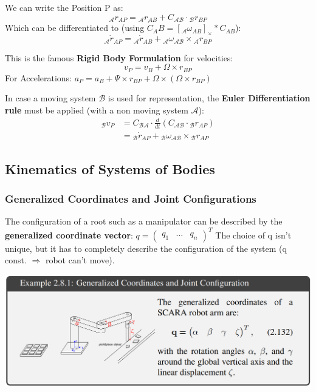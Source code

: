 \documentclass[fontsize=6pt,DIV=calc,a4paper,ngerman]{scrartcl}
\begin{document}
\begin{multicols*}{4}
	We can write the Position P as:
	$${}_\mathcal{A}r_{AP}={}_\mathcal{A}r_{AB}+C_\mathcal{AB}\cdot {}_\mathcal{B}r_{BP}$$
	Which can be differentiated to (using $\dot{C}_AB = [{}_\mathcal{A} \omega_{AB}]_{\times} * C_{AB}$):
	$${}_\mathcal{A}\dot{r}_{AP}={}_\mathcal{A}\dot{r}_{AB}+{}_\mathcal{A}\omega_\mathcal{AB}\times {}_\mathcal{A}r_{BP}$$

	This is the famous \textbf{Rigid Body Formulation} for velocities:
	$$v_P=v_B+\Omega \times r_{BP}$$
	For Accelerations:
	$a_P=a_B+\Psi\times r_{BP}+\Omega\times(\Omega\times r_{BP})$

	\smallskip
	In case a moving system $\mathcal{B}$ is used for representation, the \textbf{Euler Differentiation rule} must be applied (with a non moving system $\mathcal{A}$):
	\begin{align*}
		{}_\mathcal{B}v_P
		 & = C_\mathcal{BA} \cdot \frac{d}{dt}(C_\mathcal{AB}\cdot {}_\mathcal{B}r_{AP})             \\
		 & = {}_\mathcal{B}\dot{r}_{AP}+{}_\mathcal{B}\omega_\mathcal{AB}\times {}_\mathcal{B}r_{AP}
	\end{align*}

	\subsection{Kinematics of Systems of Bodies}
	\subsubsection{Generalized Coordinates and Joint Configurations}
	The configuration of a root such as a manipulator can be described by the \textbf{generalized coordinate vector}: $q=\begin{pmatrix}q_1 &\dots & q_n\end{pmatrix}^T$
	The choice of q isn't unique, but it has to completely describe the configuration of the system (q const. $\Rightarrow$ robot can't move).

	\begin{center}
		\includegraphics[width=0.8\linewidth]{general_coords_SCARA.png}
	\end{center}

\end{multicols*}
\end{document}
